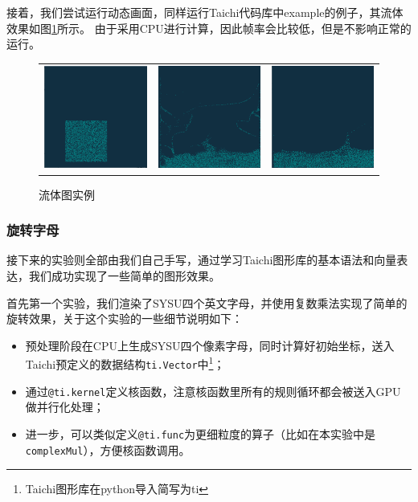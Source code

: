 \documentclass[thesis]{thesis}
\begin{document}
接着，我们尝试运行动态画面，同样运行Taichi代码库中example的例子，其流体效果如图\ref{fig:fluid}所示。
由于采用CPU进行计算，因此帧率会比较低，但是不影响正常的运行。
\begin{figure}[!ht]
\centering
\begin{tabular}{ccc}
\includegraphics[width=0.33\linewidth]{fig/mpm1.png}&
\includegraphics[width=0.33\linewidth]{fig/mpm2.png}&
\includegraphics[width=0.33\linewidth]{fig/mpm3.png}
\end{tabular}
\caption{流体图实例\protect\footnotemark}
\label{fig:fluid}
\end{figure}

\subsubsection{旋转字母}
接下来的实验则全部由我们自己手写，通过学习Taichi图形库的基本语法和向量表达，我们成功实现了一些简单的图形效果。

首先第一个实验，我们渲染了SYSU四个英文字母，并使用复数乘法实现了简单的旋转效果，关于这个实验的一些细节说明如下：
\begin{itemize}
    \item 预处理阶段在CPU上生成SYSU四个像素字母，同时计算好初始坐标，送入Taichi预定义的数据结构\verb'ti.Vector'中\footnote{Taichi图形库在python导入简写为ti}；
    \item 通过\verb'@ti.kernel'定义核函数，注意核函数里所有的规则循环都会被送入GPU做并行化处理；
    \item 进一步，可以类似定义\verb'@ti.func'为更细粒度的算子（比如在本实验中是\verb'complexMul'），方便核函数调用。
\end{itemize}
\end{document}
